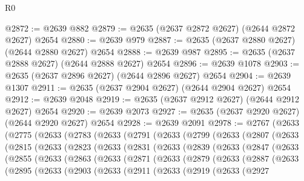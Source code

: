 \begin{lexlean}{R0}
\begin{coremodule}
@2872 := @2639 @882
@2879 := @2635 (@2637 @2872 @2627) (@2644 @2872 @2627) @2654
@2880 := @2639 @979
@2887 := @2635 (@2637 @2880 @2627) (@2644 @2880 @2627) @2654
@2888 := @2639 @987
@2895 := @2635 (@2637 @2888 @2627) (@2644 @2888 @2627) @2654
@2896 := @2639 @1078
@2903 := @2635 (@2637 @2896 @2627) (@2644 @2896 @2627) @2654
@2904 := @2639 @1307
@2911 := @2635 (@2637 @2904 @2627) (@2644 @2904 @2627) @2654
@2912 := @2639 @2048
@2919 := @2635 (@2637 @2912 @2627) (@2644 @2912 @2627) @2654
@2920 := @2639 @2073
@2927 := @2635 (@2637 @2920 @2627) (@2644 @2920 @2627) @2654
@2928 := @2639 @2091
@2978 := @2767
    (@2633
      (@2775
        (@2633
          (@2783
            (@2633
              (@2791
                (@2633
                  (@2799
                    (@2633
                      (@2807
                        (@2633
                          (@2815
                            (@2633
                              (@2823
                                (@2633
                                  (@2831
                                    (@2633
                                      (@2839
                                        (@2633
                                          (@2847
                                            (@2633
                                              (@2855
                                                (@2633
                                                  (@2863
                                                    (@2633
                                                      (@2871
                                                        (@2633
                                                          (@2879
                                                            (@2633
                                                              (@2887
                                                                (@2633
                                                                  (@2895
                                                                    (@2633
                                                                      (@2903
                                                                        (@2633
                                                                          (@2911
                                                                            (@2633
                                                                              (@2919
                                                                                (@2633
                                                                                  (@2927

\end{coremodule}
\end{lexlean}
